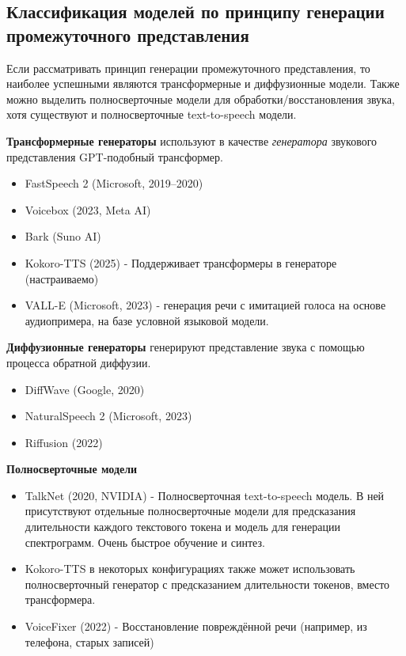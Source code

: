 \subsection{Классификация моделей по принципу генерации промежуточного представления}
Если рассматривать принцип генерации промежуточного представления, то наиболее успешными являются трансформерные и диффузионные модели.
Также можно выделить полносверточные модели для обработки/восстановления звука, хотя существуют и полносверточные text-to-speech модели.


\textbf{Трансформерные генераторы} используют в качестве \textit{генератора} звукового представления GPT-подобный трансформер.
\begin{itemize}
  \item FastSpeech 2 (Microsoft, 2019–2020) \cite{FastSpeech2}
  \item Voicebox (2023, Meta AI) \cite{le2023voicebox}
  \item Bark (Suno AI) \cite{SunoAI_Bark_2023}
  \item Kokoro-TTS (2025) \cite{kokoro} - Поддерживает трансформеры в генераторе (настраиваемо)
  \item VALL-E (Microsoft, 2023) \cite{Valle} - генерация речи с имитацией голоса на основе аудиопримера, на базе условной языковой модели.
\end{itemize}

\textbf{Диффузионные генераторы} генерируют представление звука с помощью процесса обратной диффузии.
\begin{itemize}
  \item DiffWave (Google, 2020) \cite{DiffWave}
  \item NaturalSpeech 2 (Microsoft, 2023) \cite{NaturalSpeech2}
  \item Riffusion (2022) \cite{Riffusion}
\end{itemize}

\textbf{Полносверточные модели}
\begin{itemize} 
  \item TalkNet (2020, NVIDIA) \cite{TalkNet} - Полносверточная text-to-speech модель. В ней присутствуют отдельные полносверточные модели для предсказания длительности каждого текстового токена и модель для генерации спектрограмм. Очень быстрое обучение и синтез.
  \item Kokoro-TTS \cite{kokoro} в некоторых конфигурациях также может использовать полносверточный генератор с предсказанием длительности токенов, вместо трансформера.
  \item VoiceFixer (2022) \cite{VoiceFixer} - Восстановление повреждённой речи (например, из телефона, старых записей)
\end{itemize}


